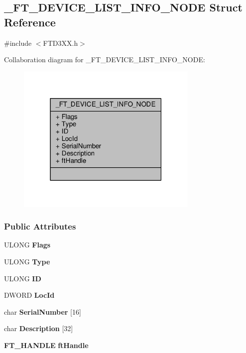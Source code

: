 \subsection{\+\_\+\+F\+T\+\_\+\+D\+E\+V\+I\+C\+E\+\_\+\+L\+I\+S\+T\+\_\+\+I\+N\+F\+O\+\_\+\+N\+O\+DE Struct Reference}
\label{struct__FT__DEVICE__LIST__INFO__NODE}


{\ttfamily \#include $<$F\+T\+D3\+X\+X.\+h$>$}



Collaboration diagram for \+\_\+\+F\+T\+\_\+\+D\+E\+V\+I\+C\+E\+\_\+\+L\+I\+S\+T\+\_\+\+I\+N\+F\+O\+\_\+\+N\+O\+DE\+:
\nopagebreak
\begin{figure}[H]
\begin{center}
\leavevmode
\includegraphics[width=247pt]{d0/d77/struct__FT__DEVICE__LIST__INFO__NODE__coll__graph}
\end{center}
\end{figure}
\subsubsection*{Public Attributes}
\begin{DoxyCompactItemize}
\item 
U\+L\+O\+NG {\bf Flags}
\item 
U\+L\+O\+NG {\bf Type}
\item 
U\+L\+O\+NG {\bf ID}
\item 
D\+W\+O\+RD {\bf Loc\+Id}
\item 
char {\bf Serial\+Number} [16]
\item 
char {\bf Description} [32]
\item 
{\bf F\+T\+\_\+\+H\+A\+N\+D\+LE} {\bf ft\+Handle}
\end{DoxyCompactItemize}


